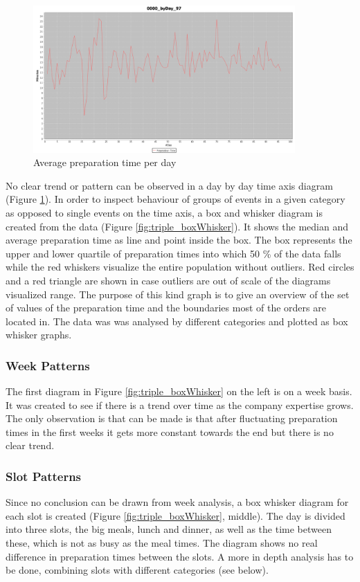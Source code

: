 \begin{figure}[h]
\begin{center}
\includegraphics[width=10cm]{images/0000_byDay_97.png}
\caption{Average preparation time per day}
\label{fig:0000_byDay_97}
\end{center}
\end{figure}


No clear trend or pattern can be observed in a day by day time axis diagram (Figure \ref{fig:0000_byDay_97}). In order to inspect behaviour of groups of events in a given category as opposed to single events on the time axis, a box and whisker diagram is created from the data (Figure \ref{fig:triple_boxWhisker}). It shows the median and average preparation time as line and point inside the box. The box represents the upper and lower quartile of preparation times into which 50 \% of the data falls while the red whiskers visualize the entire population without outliers. Red circles and a red triangle are shown in case outliers are out of scale of the diagrams visualized range. The purpose of this kind graph is to give an overview of the set of values of the preparation time and the boundaries most of the orders are located in. The data was was analysed by different categories and plotted as box whisker graphs.\newline
\subsubsection{Week Patterns}
The first diagram in Figure \ref{fig:triple_boxWhisker} on the left is on a week basis. It was created to see if there is a trend over time as the company expertise grows. The only observation is that can be made is that after fluctuating preparation times in the first weeks it gets more constant towards the end but there is no clear trend.
\subsubsection{Slot Patterns}
Since no conclusion can be drawn from week analysis, a box whisker diagram for each slot is created (Figure \ref{fig:triple_boxWhisker}, middle). The day is divided into three slots, the big meals, lunch and dinner, as well as the time between these, which is not as busy as the meal times. The diagram shows no real difference in preparation times between the slots. A more in depth analysis has to be done, combining slots with different categories (see below).
